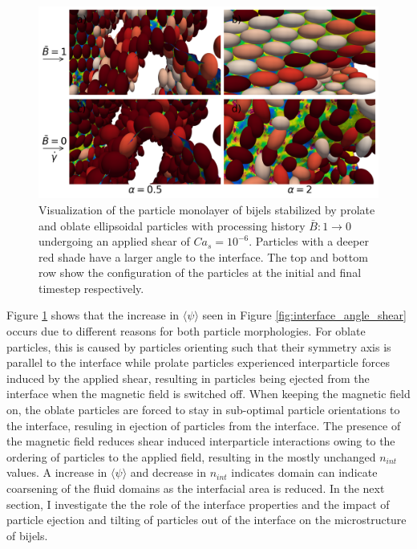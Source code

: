 \begin{figure} 
    \centering 
    \includegraphics[scale=0.4]{../figures/results/paper3/psi_concat_startB-1_endB-0.png} 
    \caption{Visualization of the particle monolayer of bijels stabilized by prolate and oblate ellipsoidal particles with processing history $\bar{B}: 1 \rightarrow 0$
             undergoing an applied shear of $Ca_s = 10^{-6}$. Particles with a deeper red shade have a larger angle to the interface. The top and bottom row show the 
             configuration of the particles at the initial and final timestep respectively.} 
    \label{fig:particle_viz_psi} 
\end{figure}

Figure \ref{fig:particle_viz_psi} shows that the increase in $\langle \psi \rangle$ seen in Figure \ref{fig:interface_angle_shear} occurs due to different
reasons for both particle morphologies. For oblate particles, this is caused by particles orienting such that their symmetry axis is parallel to the interface
while prolate particles experienced interparticle forces induced by the applied shear, resulting in particles being ejected from the interface when the magnetic 
field is switched off. When keeping the magnetic field on, the oblate particles are forced to stay in sub-optimal particle orientations to the interface, resuling
in ejection of particles from the interface. The presence of the magnetic field reduces shear induced interparticle interactions owing to the ordering of
particles to the applied field, resulting in the mostly unchanged $n_{int}$ values. A increase in $\langle \psi \rangle$ and decrease in $n_{int}$ indicates domain
can indicate coarsening of the fluid domains as the interfacial area is reduced. In the next section, I investigate the the role of the interface properties and the 
impact of particle ejection and tilting of particles out of the interface on the microstructure of bijels.

